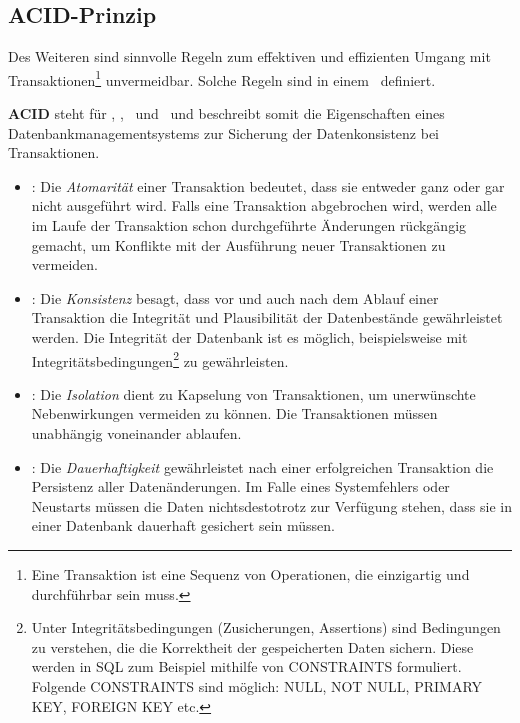 \subsection{ACID-Prinzip}\label{acid}
Des Weiteren sind sinnvolle Regeln zum effektiven und effizienten Umgang mit Transaktionen\footnote{Eine Transaktion ist eine Sequenz von Operationen, die einzigartig und durchführbar sein muss.} unvermeidbar. Solche Regeln sind in einem \acid\ definiert.

\textbf{ACID} steht für \Acid, \aCid, \acId\ und \aciD\ und beschreibt somit die Eigenschaften eines Datenbankmanagementsystems zur Sicherung der Datenkonsistenz bei Transaktionen.
\begin{itemize}

\item \Acid: Die \textit{Atomarität} einer Transaktion bedeutet, dass sie entweder ganz oder gar nicht ausgeführt wird. Falls eine Transaktion abgebrochen wird, werden alle im Laufe der Transaktion schon durchgeführte Änderungen rückgängig gemacht, um Konflikte mit der Ausführung neuer Transaktionen zu vermeiden.%
\item \aCid: Die \textit{Konsistenz} besagt, dass vor und auch nach dem Ablauf einer Transaktion die Integrität und Plausibilität der Datenbestände gewährleistet werden. Die Integrität der Datenbank ist es möglich, beispielsweise mit Integritätsbedingungen\footnote{Unter Integritätsbedingungen (Zusicherungen, Assertions) sind Bedingungen zu verstehen, die die Korrektheit der gespeicherten Daten sichern. Diese werden in SQL zum Beispiel mithilfe von CONSTRAINTS formuliert. Folgende CONSTRAINTS sind möglich: NULL, NOT NULL, PRIMARY KEY, FOREIGN KEY etc.} zu gewährleisten. 
\item \acId: Die \textit{Isolation} dient zu Kapselung von Transaktionen, um unerwünschte Nebenwirkungen vermeiden zu können. Die Transaktionen müssen unabhängig voneinander ablaufen.
\item \aciD: Die \textit{Dauerhaftigkeit} gewährleistet nach einer erfolgreichen Transaktion die Persistenz aller Datenänderungen. Im Falle eines Systemfehlers oder Neustarts müssen die Daten nichtsdestotrotz zur Verfügung stehen, dass sie in einer Datenbank dauerhaft gesichert sein müssen.
\end{itemize}

